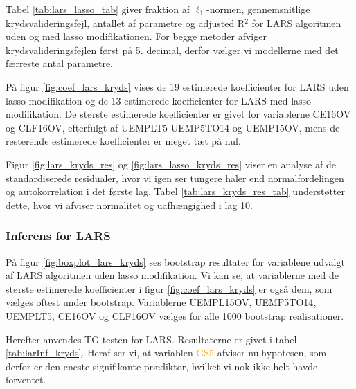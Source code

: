 
Tabel \ref{tab:lars_lasso_tab} giver fraktion af \(\ell_1\)-normen, gennemsnitlige krydsvalideringsfejl, antallet af parametre og adjusted R$^2$ for LARS algoritmen uden og med lasso modifikationen. 
For begge metoder afviger krydsvalideringsfejlen først på 5. decimal, derfor vælger vi modellerne med det færreste antal parametre. 
%

%
På figur \ref{fig:coef_lars_kryds} vises de 19 estimerede koefficienter for LARS uden lasso modifikation og de 13 estimerede koefficienter for LARS med lasso modifikation. 
De største estimerede koefficienter er givet for variablerne \textcolor{blue3}{CE16OV} og \textcolor{blue3}{CLF16OV}, efterfulgt af \textcolor{blue3}{UEMPLT5} \textcolor{blue3}{UEMP5TO14} og \textcolor{blue3}{UEMP15OV}, mens de resterende estimerede koefficienter er meget tæt på nul. 


Figur \ref{fig:lars_kryds_res} og \ref{fig:lars_lasso_kryds_res} viser en analyse af de standardiserede residualer, hvor vi igen ser tungere haler end normalfordelingen og autokorrelation i det første lag. 
Tabel \ref{tab:lars_kryds_res_tab} understøtter dette, hvor vi afviser normalitet og uafhængighed i lag 10. 

\newpage
\subsubsection{Inferens for LARS}
På figur \ref{fig:boxplot_lars_kryds} ses bootstrap resultater for variablene udvalgt af LARS algoritmen uden lasso modifikation. 
Vi kan se, at variablerne med de største estimerede koefficienter i figur \ref{fig:coef_lars_kryds} er også dem, som vælges oftest under bootstrap. 
Variablerne \textcolor{blue3}{UEMPL15OV}, \textcolor{blue3}{UEMP5TO14}, \textcolor{blue3}{UEMPLT5}, \textcolor{blue3}{CE16OV} og \textcolor{blue3}{CLF16OV} vælges for alle 1000 bootstrap realisationer.


Herefter anvendes TG testen for LARS.
Resultaterne er givet i tabel \ref{tab:larInf_kryds}.
Heraf ser vi, at variablen \textcolor{orange}{GS5} afviser nulhypotesen, som derfor er den eneste signifikante prædiktor, hvilket vi nok ikke helt havde forventet. 
%

%

